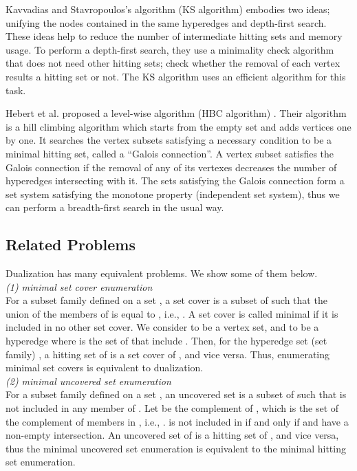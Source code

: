 Kavvadias and Stavropoulos's algorithm (KS algorithm) \cite{KvSt99,KvSt05}
 embodies two ideas; unifying the nodes contained in the same hyperedges
 and depth-first search.
These ideas help to reduce the number of intermediate hitting sets and
 memory usage.
To perform a depth-first search, they use a minimality check algorithm
 that does not need other hitting sets;
 check whether the removal of each vertex results a hitting set or not.
The KS algorithm uses an efficient algorithm for this task.

Hebert et al. proposed a level-wise algorithm (HBC algorithm) \cite{HcBa07}.
Their algorithm is a hill climbing algorithm which starts from the empty set
 and adds vertices one by one.
It searches the vertex subsets satisfying a necessary condition to be
 a minimal hitting set, called a ``Galois connection''.
A vertex subset satisfies the Galois connection if the removal of any of
 its vertexes decreases the number of hyperedges intersecting with it.
The sets satisfying the Galois connection form a set system satisfying
 the monotone property (independent set system), thus we can perform
 a breadth-first search in the usual way.
 


\subsection{Related Problems}

Dualization has many equivalent problems.
We show some of them below.\\

{\em (1) minimal set cover enumeration}\\
For a subset family  defined on a set , a set cover  is a
 subset of  such that the union of the members of  is equal to
 , i.e., .
A set cover is called minimal if it is included in no other set cover.
We consider  to be a vertex set, and  to be a hyperedge
 where  is the set of  that include .
Then, for the hyperedge set (set family) , 
 a hitting set of  is a set cover of , and vice versa.
Thus, enumerating minimal set covers is equivalent to dualization.\\

{\em (2) minimal uncovered set enumeration}\\
For a subset family  defined on a set , an uncovered set 
 is a subset of  such that  is not included in any member of .
Let  be the complement of , which is the set of the
 complement of members in , i.e.,
 .
 is not included in  if and only if  and 
 have a non-empty intersection.
An uncovered set of  is a hitting set of , and vice
 versa, thus the minimal uncovered set enumeration is equivalent to the
 minimal hitting set enumeration.\\

